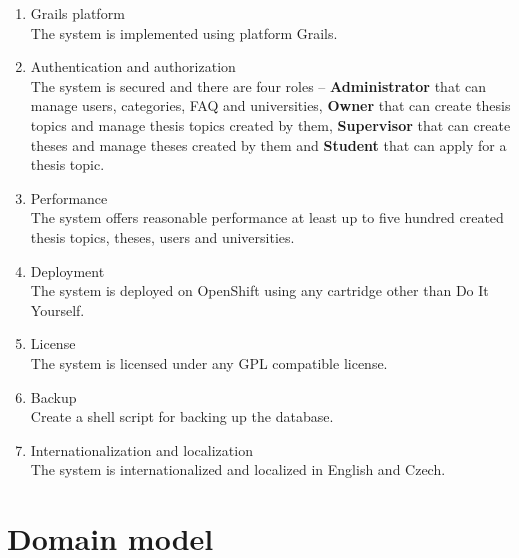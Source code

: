 \begin{enumerate}
    \item Grails platform\\
    The system is implemented using platform Grails.

    \item Authentication and authorization\\
    The system is secured and there are four roles -- \textbf{Administrator} that can manage users, categories, FAQ and universities, \textbf{Owner} that can create thesis topics and manage thesis topics created by them, \textbf{Supervisor} that can create theses and manage theses created by them and \textbf{Student} that can apply for a thesis topic.

    \item Performance\\
    The system offers reasonable performance at least up to five hundred created thesis topics, theses, users and universities.

    \item Deployment\\
    The system is deployed on OpenShift using any cartridge other than Do It Yourself.

    \item License\\
    The system is licensed under any GPL compatible license.

    \item Backup\\
    Create a shell script for backing up the database.

    \item Internationalization and localization\\
    The system is internationalized and localized in English and Czech.

\end{enumerate}

\section{Domain model}

\faketext[30]